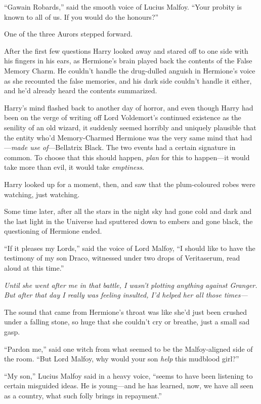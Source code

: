 “Gawain Robards,” said the smooth voice of Lucius Malfoy. “Your probity is known to all of us. If you would do the honours?”

One of the three Aurors stepped forward.

After the first few questions Harry looked away and stared off to one side with his fingers in his ears, as Hermione’s brain played back the contents of the False Memory Charm. He couldn’t handle the drug-dulled anguish in Hermione’s voice as she recounted the false memories, and his dark side couldn’t handle it either, and he’d already heard the contents summarized.

Harry’s mind flashed back to another day of horror, and even though Harry had been on the verge of writing off Lord Voldemort’s continued existence as the senility of an old wizard, it suddenly seemed horribly and uniquely plausible that the entity who’d Memory-Charmed Hermione was the very same mind that had—\emph{made use of}—Bellatrix Black. The two events had a certain signature in common. To choose that this should happen, \emph{plan} for this to happen—it would take more than evil, it would take \emph{emptiness}.

Harry looked up for a moment, then, and saw that the plum-coloured robes were watching, just watching.

Some time later, after all the stars in the night sky had gone cold and dark and the last light in the Universe had sputtered down to embers and gone black, the questioning of Hermione ended.

“If it pleases my Lords,” said the voice of Lord Malfoy, “I should like to have the testimony of my son Draco, witnessed under two drops of Veritaserum, read aloud at this time.”

\emph{Until she went after me in that battle, I wasn’t plotting anything against Granger. But after that day I really was feeling insulted, I’d helped her all those times—}

The sound that came from Hermione’s throat was like she’d just been crushed under a falling stone, so huge that she couldn’t cry or breathe, just a small sad gasp.

“Pardon me,” said one witch from what seemed to be the Malfoy-aligned side of the room. “But Lord Malfoy, why would your son \emph{help} this mudblood girl?”

“My son,” Lucius Malfoy said in a heavy voice, “seems to have been listening to certain misguided ideas. He is young—and he has learned, now, we have all seen as a country, what such folly brings in repayment.”


